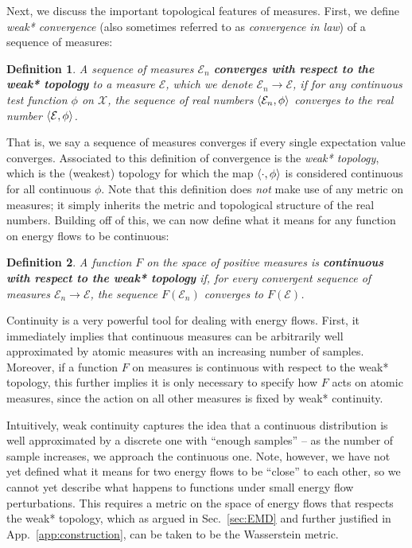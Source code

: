 \documentclass[letterpaper,11pt]{article}
\newcommand{\E}{\mathcal{E}}
\newcommand{\X}{\mathcal{X}}
\DeclareRobustCommand{\Sec}[1]{Sec.~\ref{sec:#1}}
\DeclareRobustCommand{\App}[1]{App.~\ref{app:#1}}
\newtheorem{definition}{Definition}
\begin{document}
Next, we discuss the important topological features of measures. First, we define \emph{weak* convergence} (also sometimes referred to as \emph{convergence in law}) of a sequence of measures:
%
\begin{definition}
    A sequence of measures $\E_n$ \textbf{converges with respect to the weak* topology} to a measure $\E$, which we denote $\E_n \to \E$, if for any continuous test function $\phi$ on $\X$, the sequence of real numbers $\expval{\E_n, \phi}$ converges to the real number $\expval{\E, \phi}$.
\end{definition}
%
That is, we say a sequence of measures converges if every single expectation value converges. Associated to this definition of convergence is the \emph{weak* topology}, which is the (weakest) topology for which the map $\expval{\cdot, \phi}$ is considered continuous for all continuous $\phi$. Note that this definition does \emph{not} make use of any metric on measures; it simply inherits the metric and topological structure of the real numbers. Building off of this, we can now define what it means for any function on energy flows to be continuous:
%
\begin{definition}
    A function $F$ on the space of positive measures is \textbf{continuous with respect to the weak* topology} if, for every convergent sequence of measures $\E_n \to \E$, the sequence $F(\E_n)$ converges to $F(\E)$. 
\end{definition}



Continuity is a very powerful tool for dealing with energy flows. First, it immediately implies that continuous measures can be arbitrarily well approximated by atomic measures with an increasing number of samples. Moreover, if a function $F$ on measures is continuous with respect to the weak* topology, this further implies it is only necessary to specify how $F$ acts on atomic measures, since the action on all other measures is fixed by weak* continuity. 





Intuitively, weak continuity captures the idea that a continuous distribution is well approximated by a discrete one with ``enough samples'' -- as the number of sample increases, we approach the continuous one. Note, however, we have not yet defined what it means for two energy flows to be ``close'' to each other, so we cannot yet describe what happens to functions under small energy flow perturbations. This requires a metric on the space of energy flows that respects the weak* topology, which as argued in \Sec{EMD} and further justified in \App{construction}, can be taken to be the Wasserstein metric.
\end{document}
